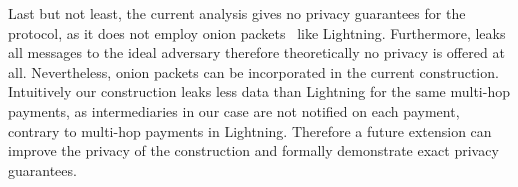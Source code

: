  Last but not least, the current analysis gives no privacy guarantees for the
  protocol, as it does not employ onion packets~\cite{sphinx} like Lightning.
  Furthermore, \fchan leaks all messages to the ideal adversary therefore
  theoretically no privacy is offered at all. Nevertheless, onion packets can be
  incorporated in the current construction. Intuitively our construction
  leaks less data than Lightning for the same multi-hop payments, as
  intermediaries in our case are not notified on each payment, contrary to
  multi-hop payments in Lightning. Therefore a future extension can improve the
  privacy of the construction and formally demonstrate exact privacy guarantees.

